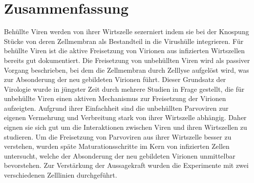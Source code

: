 

\chapter*{Zusammenfassung}

\label{Zusammenfassung} %

Behüllte Viren werden von ihrer Wirtszelle sezerniert indem sie bei der Knospung Stücke von deren Zellmembran als Bestandteil in die Virushülle integrieren. Für behüllte Viren ist die aktive Freisetzung von Virionen aus infizierten Wirtszellen bereits gut dokumentiert. Die Freisetzung von unbehüllten Viren wird als passiver Vorgang beschrieben, bei dem die Zellmembran durch Zelllyse aufgelöst wird, was zur Absonderung der neu gebildeten Virionen führt. Dieser Grundsatz der Virologie wurde in jüngster Zeit durch mehrere Studien in Frage gestellt, die für unbehüllte Viren einen aktiven Mechanismus zur Freisetzung der Virionen aufzeigten. Aufgrund ihrer Einfachheit sind die unbehüllten Parvoviren zur eigenen Vermehrung und Verbreitung stark von ihrer Wirtszelle abhängig. Daher eignen sie sich gut um die Interaktionen zwischen Viren und ihren Wirtszellen zu studieren. Um die Freisetzung von Parvoviren aus ihrer Wirtszelle besser zu verstehen, wurden späte Maturationsschritte im Kern von infizierten Zellen untersucht, welche  der Absonderung der neu gebildeten Virionen unmittelbar bevorstehen. Zur Verstärkung der Aussagekraft wurden die Experimente mit zwei verschiedenen Zelllinien durchgeführt. 


